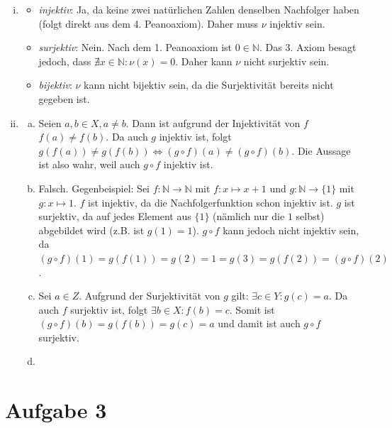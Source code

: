 \documentclass[12pt,a4paper]{article}
\begin{document}
\begin{enumerate}[(i)]
    \item \begin{itemize}
        \item \textit{injektiv}: Ja, da keine zwei natürlichen Zahlen denselben Nachfolger haben (folgt direkt aus dem 4. Peanoaxiom). Daher muss $\nu$ injektiv sein.
        \item \textit{surjektiv}: Nein. Nach dem 1. Peanoaxiom ist $0 \in \mathbb{N}.$ Das 3. Axiom besagt jedoch, dass $\nexists x \in \mathbb{N} : \nu(x) = 0.$ Daher kann $\nu$ nicht surjektiv sein.
        \item \textit{bijektiv}: $\nu$ kann nicht bijektiv sein, da die Surjektivität bereits nicht gegeben ist.
    \end{itemize}
    \item \begin{enumerate}[(a)]
        \item Seien $a, b \in X, a \neq b$.
        Dann ist aufgrund der Injektivität von $f$ $f(a) \neq f(b)$.
        Da auch $g$ injektiv ist, folgt $g(f(a)) \neq g(f(b)) \Leftrightarrow (g \circ f)(a) \neq (g \circ f)(b)$.
        Die Aussage ist also wahr, weil auch $g \circ f$ injektiv ist.
        \item Falsch. Gegenbeispiel: Sei $f: \mathbb{N} \rightarrow \mathbb{N}$ mit $f: x \mapsto x+1$ und $g: \mathbb{N} \rightarrow \{1\}$ mit $g: x \mapsto 1.$ $f$ ist injektiv, da die Nachfolgerfunktion schon injektiv ist. $g$ ist surjektiv, da auf jedes Element aus $\{1\}$ (nämlich nur die $1$ selbst) abgebildet wird (z.B. ist $g(1) = 1$). $g \circ f$ kann jedoch nicht injektiv sein, da $(g \circ f) (1) = g(f(1)) = g(2) = 1 = g(3) = g(f(2)) = (g \circ f) (2)$.
        \item Sei $a \in Z$.
        Aufgrund der Surjektivität von $g$ gilt: $\exists c \in Y: g(c) = a.$
        Da auch $f$ surjektiv ist, folgt $\exists b \in X: f(b) = c.$
        Somit ist $(g \circ f)(b) = g(f(b)) = g(c) = a$ und damit ist auch $g \circ f$ surjektiv.
        \item
    \end{enumerate}
\end{enumerate}


\section*{Aufgabe 3}
\end{document}
